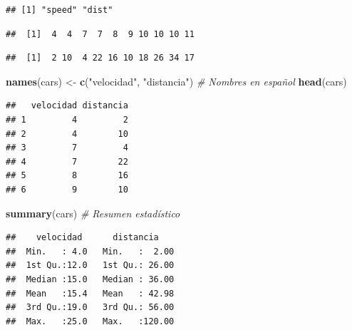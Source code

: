 \documentclass[]{book}
\newenvironment{Shaded}{\begin{snugshade}}{\end{snugshade}}
\newcommand{\KeywordTok}[1]{\textcolor[rgb]{0.13,0.29,0.53}{\textbf{#1}}}
\newcommand{\DecValTok}[1]{\textcolor[rgb]{0.00,0.00,0.81}{#1}}
\newcommand{\StringTok}[1]{\textcolor[rgb]{0.31,0.60,0.02}{#1}}
\newcommand{\CommentTok}[1]{\textcolor[rgb]{0.56,0.35,0.01}{\textit{#1}}}
\newcommand{\OperatorTok}[1]{\textcolor[rgb]{0.81,0.36,0.00}{\textbf{#1}}}
\newcommand{\NormalTok}[1]{#1}
\begin{document}
\begin{verbatim}
## [1] "speed" "dist"
\end{verbatim}

\begin{Shaded}
\end{Shaded}

\begin{verbatim}
##  [1]  4  4  7  7  8  9 10 10 10 11
\end{verbatim}

\begin{Shaded}
\end{Shaded}

\begin{verbatim}
##  [1]  2 10  4 22 16 10 18 26 34 17
\end{verbatim}

\begin{Shaded}
\begin{Highlighting}[]
\KeywordTok{names}\NormalTok{(cars) <-}\StringTok{ }\KeywordTok{c}\NormalTok{(}\StringTok{"velocidad"}\NormalTok{, }\StringTok{"distancia"}\NormalTok{)  }\CommentTok{# Nombres en español}
\KeywordTok{head}\NormalTok{(cars)}
\end{Highlighting}
\end{Shaded}

\begin{verbatim}
##   velocidad distancia
## 1         4         2
## 2         4        10
## 3         7         4
## 4         7        22
## 5         8        16
## 6         9        10
\end{verbatim}

\begin{Shaded}
\begin{Highlighting}[]
\KeywordTok{summary}\NormalTok{(cars)   }\CommentTok{# Resumen estadístico}
\end{Highlighting}
\end{Shaded}

\begin{verbatim}
##    velocidad      distancia     
##  Min.   : 4.0   Min.   :  2.00  
##  1st Qu.:12.0   1st Qu.: 26.00  
##  Median :15.0   Median : 36.00  
##  Mean   :15.4   Mean   : 42.98  
##  3rd Qu.:19.0   3rd Qu.: 56.00  
##  Max.   :25.0   Max.   :120.00
\end{verbatim}
\end{document}
